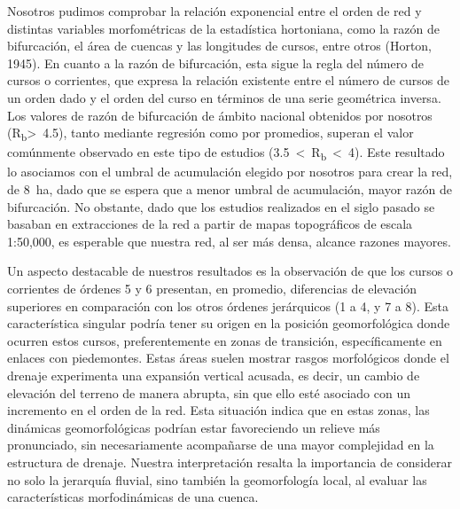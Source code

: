 \documentclass[spanish]{article}
\begin{document}
Nosotros pudimos comprobar la relación exponencial entre el orden de red
y distintas variables morfométricas de la estadística hortoniana, como
la razón de bifurcación, el área de cuencas y las longitudes de cursos,
entre otros (Horton, 1945). En cuanto a la razón de bifurcación, esta
sigue la regla del número de cursos o corrientes, que expresa la
relación existente entre el número de cursos de un orden dado y el orden
del curso en términos de una serie geométrica inversa. Los valores de
razón de bifurcación de ámbito nacional obtenidos por nosotros
(R\textsubscript{b}\textgreater~4.5), tanto mediante regresión como por
promedios, superan el valor comúnmente observado en este tipo de
estudios (3.5~\textless~R\textsubscript{b}~\textless~4). Este resultado
lo asociamos con el umbral de acumulación elegido por nosotros para
crear la red, de 8~ha, dado que se espera que a menor umbral de
acumulación, mayor razón de bifurcación. No obstante, dado que los
estudios realizados en el siglo pasado se basaban en extracciones de la
red a partir de mapas topográficos de escala 1:50,000, es esperable que
nuestra red, al ser más densa, alcance razones mayores.

Un aspecto destacable de nuestros resultados es la observación de que
los cursos o corrientes de órdenes 5 y 6 presentan, en promedio,
diferencias de elevación superiores en comparación con los otros órdenes
jerárquicos (1 a 4, y 7 a 8). Esta característica singular podría tener
su origen en la posición geomorfológica donde ocurren estos cursos,
preferentemente en zonas de transición, específicamente en enlaces con
piedemontes. Estas áreas suelen mostrar rasgos morfológicos donde el
drenaje experimenta una expansión vertical acusada, es decir, un cambio
de elevación del terreno de manera abrupta, sin que ello esté asociado
con un incremento en el orden de la red. Esta situación indica que en
estas zonas, las dinámicas geomorfológicas podrían estar favoreciendo un
relieve más pronunciado, sin necesariamente acompañarse de una mayor
complejidad en la estructura de drenaje. Nuestra interpretación resalta
la importancia de considerar no solo la jerarquía fluvial, sino también
la geomorfología local, al evaluar las características morfodinámicas de
una cuenca.
\end{document}
